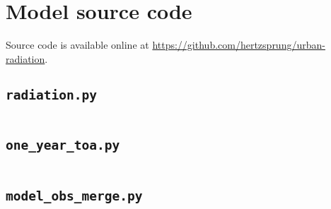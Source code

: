 \documentclass[a4paper,titlepage, twoside]{report}
\begin{document}
\printbibliography

\appendix
\chapter{Model source code}
\vspace{-2em}
Source code is available online at \url{https://github.com/hertzsprung/urban-radiation}.

\section{\texttt{radiation.py}}
\inputminted[fontsize=\footnotesize, tabsize=4]{python}{radiation.py}

\section{\texttt{one\_year\_toa.py}}
\inputminted[fontsize=\footnotesize, tabsize=4]{python}{one_year_toa.py}

\section{\texttt{model\_obs\_merge.py}}
\inputminted[fontsize=\footnotesize, tabsize=4]{python}{model_obs_merge.py}
\end{document}
